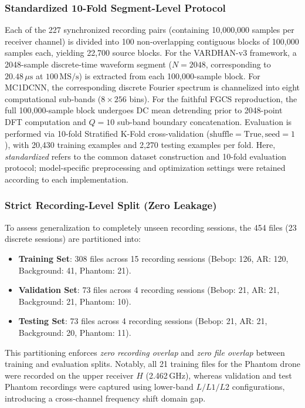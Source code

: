 \documentclass[journal,10pt,twocolumn]{IEEEtran}
\begin{document}
\subsubsection{Standardized 10-Fold Segment-Level Protocol}
Each of the 227 synchronized recording pairs (containing 10,000,000 samples per receiver channel) is divided into 100 non-overlapping contiguous blocks of 100,000 samples each, yielding 22,700 source blocks. For the VARDHAN-v3 framework, a 2048-sample discrete-time waveform segment ($N=2048$, corresponding to $20.48\,\mu\text{s}$ at $100\,\text{MS/s}$) is extracted from each 100,000-sample block. For MC1DCNN, the corresponding discrete Fourier spectrum is channelized into eight computational sub-bands ($8 \times 256$ bins). For the faithful FGCS reproduction, the full 100,000-sample block undergoes DC mean detrending prior to 2048-point DFT computation and $Q=10$ sub-band boundary concatenation. Evaluation is performed via 10-fold Stratified K-Fold cross-validation ($\text{shuffle}=\text{True}, \text{seed}=1$), with 20,430 training examples and 2,270 testing examples per fold. Here, \textit{standardized} refers to the common dataset construction and 10-fold evaluation protocol; model-specific preprocessing and optimization settings were retained according to each implementation.

\subsubsection{Strict Recording-Level Split (Zero Leakage)}
To assess generalization to completely unseen recording sessions, the 454 files (23 discrete sessions) are partitioned into:
\begin{itemize}
    \item \textbf{Training Set}: 308 files across 15 recording sessions (Bebop: 126, AR: 120, Background: 41, Phantom: 21).
    \item \textbf{Validation Set}: 73 files across 4 recording sessions (Bebop: 21, AR: 21, Background: 21, Phantom: 10).
    \item \textbf{Testing Set}: 73 files across 4 recording sessions (Bebop: 21, AR: 21, Background: 20, Phantom: 11).
\end{itemize}
This partitioning enforces \textit{zero recording overlap} and \textit{zero file overlap} between training and evaluation splits. Notably, all 21 training files for the Phantom drone were recorded on the upper receiver $H$ (2.462\,GHz), whereas validation and test Phantom recordings were captured using lower-band $L/L1/L2$ configurations, introducing a cross-channel frequency shift domain gap.
\end{document}
